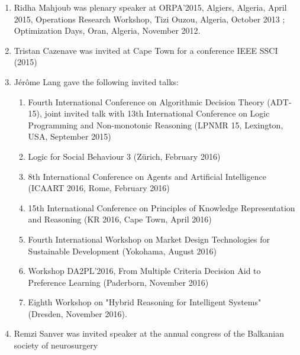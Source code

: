 \documentclass[version=last, pagesize, twoside=semi, DIV=calc, 12pt, a4paper, french, english, bibliography=totoc]{scrartcl}
\begin{document}
\begin{enumerate}
\item Ridha Mahjoub was plenary speaker at  ORPA’2015,  Algiers, Algeria, April 2015,  Operations Research Workshop, Tizi Ouzou, Algeria, October 2013 ; Optimization Days, Oran, Algeria, November 2012.
\item Tristan Cazenave was invited at Cape Town for a conference IEEE SSCI (2015)%
\item J\'er\^ome Lang gave the following invited talks: \begin{enumerate} \item Fourth International Conference on Algorithmic Decision Theory (ADT-15), joint invited talk with 13th International Conference on Logic Programming and Non-monotonic Reasoning (LPNMR 15, Lexington, USA, September 2015) \item  Logic for Social Behaviour 3 (Z\"urich, February 2016) \item  8th International Conference on Agents and Artificial Intelligence (ICAART 2016, Rome, February 2016) \item 
 15th International Conference on Principles of Knowledge Representation and Reasoning (KR 2016, Cape Town, April 2016) \item  
 Fourth International Workshop on Market Design Technologies for Sustainable Development (Yokohama, August 2016)
\item  Workshop DA2PL'2016, From Multiple Criteria Decision Aid to Preference Learning (Paderborn, November 2016)
\item  Eighth Workshop on "Hybrid Reasoning for Intelligent Systems" (Dresden, November 2016).
\end{enumerate}
\item Remzi Sanver was invited speaker at the annual congress of the Balkanian society of neurosurgery


\end{enumerate}
\end{document}

